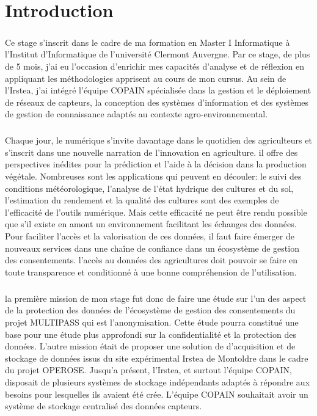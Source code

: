 \renewcommand{\partname}{}
\renewcommand{\chaptername}{}
\renewcommand{\thechapter}{}
\renewcommand{\thesection}{}



\chapter{Introduction}
\paragraph{}
Ce stage s’inscrit dans le cadre de ma formation en Master I Informatique à l’Institut d’Informatique de l’université Clermont Auvergne. Par ce stage, de plus de 5 mois, j’ai eu l’occasion d'enrichir mes capacités d’analyse et de réflexion en appliquant les méthodologies apprisent au cours de mon cursus. 
Au sein de l’Irstea, j’ai intégré l’équipe COPAIN spécialisée dans la gestion et le déploiement de réseaux de capteurs, la conception des systèmes d’information et des systèmes de gestion de connaissance adaptés au contexte agro-environnemental.
\paragraph{}
Chaque jour, le numérique s’invite davantage dans le quotidien des agriculteurs et s’inscrit dans une nouvelle narration de l’innovation en agriculture. il offre des perspectives inédites pour la prédiction et l’aide à la  décision dans la production végétale. Nombreuses sont les applications qui peuvent en découler: le suivi des conditions météorologique, l’analyse de l’état hydrique des cultures et du sol, l’estimation du rendement et la qualité des cultures sont des exemples de l'efficacité de l’outils numérique. Mais cette efficacité ne peut être rendu possible que s’il existe en amont un environnement facilitant les échanges des données. Pour faciliter l’accès et la valorisation de ces données, il faut faire émerger de nouveaux services dans une chaîne de confiance dans un écosystème de gestion des consentements. l’accès au données des agricultures doit pouvoir se faire en toute transparence et conditionné à une bonne compréhension de l’utilisation.
\paragraph{}
la première mission de mon stage fut donc de faire une étude sur l’un des aspect  de la protection des données  de l’écosystème de gestion des consentements du projet MULTIPASS qui est l’anonymisation. Cette étude pourra constitué une base pour une étude plus approfondi sur la confidentialité et la protection des données.
L’autre mission était de proposer une solution de d’acquisition et de stockage de données issus du site expérimental Irstea de Montoldre dans le cadre du projet \gls{OPEROSE}. Jusqu’a présent, l'Irstea, et surtout l’équipe COPAIN, disposait de plusieurs systèmes de stockage indépendants adaptés à répondre aux besoins pour lesquelles ils avaient été crée. L’équipe COPAIN souhaitait avoir un système de stockage centralisé des données capteurs.

